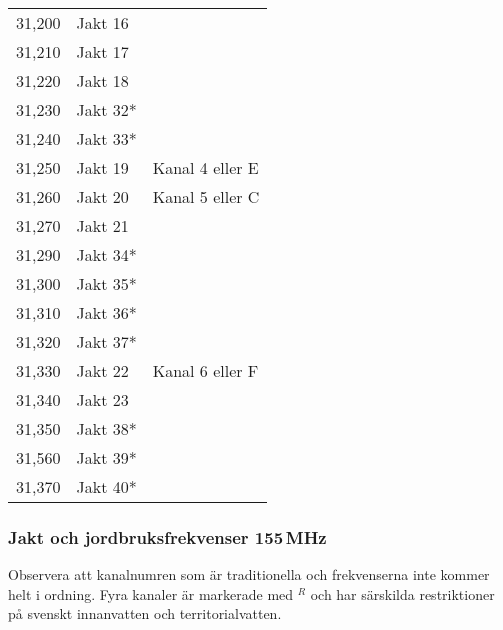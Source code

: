 \begin{longtable}{rll}
31,200            & Jakt 16            &                             \\
31,210            & Jakt 17            &                             \\
31,220            & Jakt 18            &                             \\
31,230            & Jakt 32*           &                             \\
31,240            & Jakt 33*           &                             \\
31,250            & Jakt 19            & Kanal 4 eller E             \\
31,260            & Jakt 20            & Kanal 5 eller C             \\
31,270            & Jakt 21            &                             \\
31,290            & Jakt 34*           &                             \\
31,300            & Jakt 35*           &                             \\
31,310            & Jakt 36*           &                             \\
31,320            & Jakt 37*           &                             \\
31,330            & Jakt 22            & Kanal 6 eller F             \\
31,340            & Jakt 23            &                             \\
31,350            & Jakt 38*           &                             \\
31,560            & Jakt 39*           &                             \\
31,370            & Jakt 40*           &                             \\
\end{longtable}


\subsubsection{Jakt och jordbruksfrekvenser 155\,MHz}

Observera att kanalnumren som är traditionella och frekvenserna inte kommer helt i ordning. Fyra kanaler är markerade med $^R$ och har särskilda restriktioner på svenskt innanvatten och territorialvatten.


